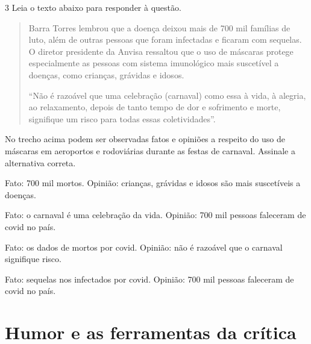 \num{3} Leia o texto abaixo para responder à questão.

\begin{quote}

Barra Torres lembrou que a doença deixou mais de 700 mil famílias de
luto, além de outras pessoas que foram infectadas e ficaram com
sequelas. O diretor presidente da Anvisa ressaltou que o uso de máscaras
protege especialmente as pessoas com sistema imunológico mais suscetível
a doenças, como crianças, grávidas e idosos.  

``Não é razoável que uma celebração (carnaval) como essa à vida, à
alegria, ao relaxamento, depois de tanto tempo de dor e sofrimento e
morte, signifique um risco para todas essas coletividades''.

\end{quote}


No trecho acima podem ser observadas fatos e opiniões a respeito do uso
de máscaras em aeroportos e rodoviárias durante as festas de carnaval.
Assinale a alternativa correta.

\begin{escolha}

  \item Fato: 700 mil mortos. Opinião: crianças, grávidas e idosos são mais suscetíveis a doenças.

  \item Fato: o carnaval é uma celebração da vida. Opinião: 700 mil pessoas faleceram de covid no país.
  
  \item Fato: os dados de mortos por covid. Opinião: não é razoável que o carnaval signifique risco.
  
  \item Fato: sequelas nos infectados por covid. Opinião: 700 mil pessoas faleceram de covid no país.

\end{escolha}


\chapter{Humor e as ferramentas da crítica}

